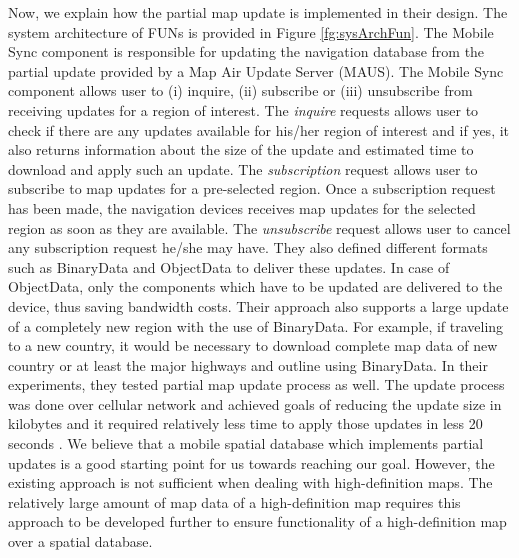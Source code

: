 Now, we explain how the partial map update is implemented in their design. The system architecture of FUNs is provided in Figure \ref{fg:sysArchFun}. The Mobile Sync component is responsible for updating the navigation database from the partial update provided by a Map Air Update Server (MAUS). The Mobile Sync component allows user to (i) inquire, (ii) subscribe or (iii) unsubscribe from receiving updates for a region of interest. The \textit{inquire} requests allows user to check if there are any updates available for his/her region of interest and if yes, it also returns information about the size of the update and estimated time to download and apply such an update. The \textit{subscription} request allows user to subscribe to map updates for a pre-selected region. Once a subscription request has been made, the navigation devices receives map updates for the selected region as soon as they are available. The \textit{unsubscribe} request allows user to cancel any subscription request he/she may have. They also defined different formats such as BinaryData and ObjectData to deliver these updates. In case of ObjectData, only the components which have to be updated are delivered to the device, thus saving bandwidth costs. Their approach also supports a large update of a completely new region with the use of BinaryData. For example, if traveling to a new country, it would be necessary to download complete map data of new country or at least the major highways and outline using BinaryData. In their experiments, they tested partial map update process as well. The update process was done over cellular network and achieved goals of reducing the update size in kilobytes and it required relatively less time to apply those updates in less 20 seconds \cite{min2008mobile}. We believe that a mobile spatial database which implements partial updates is a good starting point for us towards reaching our goal. However, the existing approach is not sufficient when dealing with high-definition maps. The relatively large amount of map data of a high-definition map requires this approach to be developed further to ensure functionality of a high-definition map over a spatial database. 

